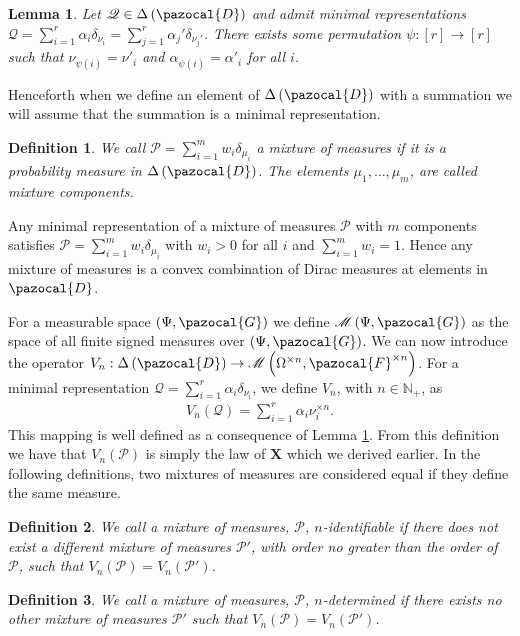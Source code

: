 \documentclass[aos,preprint]{imsart}
\def\nn{\mathbb{N}}
\def\sF{\pazocal{F}}
\def\sG{\pazocal{G}}
\def\sM{\pazocal{M}}
\def\sD{\pazocal{D}}
\def\sP{\mathscr{P}}
\def\sM{\mathscr{M}}
\def\sQ{\mathscr{Q}}
\def\bX{\mathbf{X}}
\def\dd{\Delta\left( \sD \right)}
\theoremstyle{plain}
\newtheorem{lem}{Lemma}[section]
\theoremstyle{defintion}
\newtheorem{defin}{Definition}[section]
\begin{document}
	\begin{lem} \label{lem:represent}
		Let $\sQ\in \dd$ and admit minimal representations $\sQ = \sum_{i=1}^r  \alpha_i \delta_{\nu_i}= \sum_{j=1}^r \alpha_j'\delta_{\nu_j'}$. There exists some permutation $\psi:\left[ r \right] \to \left[ r \right]$ such that $\nu_{\psi\left( i \right)} = \nu'_i$ and $\alpha_{\psi\left( i \right)} = \alpha'_i$ for all $i$.
	\end{lem}
	Henceforth when we define an element of $\dd$ with a summation we will assume that the summation is a minimal representation.
	\begin{defin} \label{def:mixmeasure}
		We call $\sP =\sum_{i=1}^m w_i \delta_{\mu_i}$ a {\em mixture of measures} if it is a probability measure in $\dd$. The elements $\mu_1,\ldots,\mu_m$, are called {\em mixture components}.
	\end{defin}

	Any minimal representation of a mixture of measures $\sP$ with $m$ components satisfies $\sP=\sum_{i=1}^m w_i \delta_{\mu_i}$ with $w_i>0$ for all $i$ and $\sum_{i=1}^m w_i = 1$. Hence any mixture of measures is a convex combination of Dirac measures at elements in $\sD$.

	
	For a measurable space $\left(\Psi, \sG \right)$ we define $\sM \left(\Psi, \sG \right)$ as the space of all finite signed measures over $\left(\Psi, \sG \right)$. We can now introduce the operator $V_n:\dd\to \sM\left( \Omega^{\times n}, \sF^{\times n} \right)$. For a minimal representation $\sQ =\sum_{i=1}^r  \alpha_i\delta_{\nu_i}$, we define $V_n$, with $n \in \nn_+$, as 
	\begin{eqnarray*}
		V_n(\sQ) =\sum_{i=1}^r  \alpha_i\nu_i^{\times n}.
	\end{eqnarray*}
	This mapping is well defined as a consequence of Lemma \ref{lem:represent}.
	From this definition we have that $V_n\left( \sP \right)$ is simply the law of $\bX$ which we derived earlier. In the following definitions, two mixtures of measures are considered equal if they define the same measure.

	\begin{defin}\label{def:ident}
		We call a mixture of measures, $\sP$, \emph{$n$-identifiable} if there does not exist a different mixture of measures $\sP'$, with order no greater than the order of $\sP$, such that $V_n\left( \sP \right) = V_n\left( \sP' \right)$.
	\end{defin}
	\begin{defin}\label{def:det}
		We call a mixture of measures, $\sP$, \emph{$n$-determined} if there exists no other mixture of measures $\sP'$ such that $V_n\left( \sP \right) = V_n\left( \sP' \right)$. 
	\end{defin}
\end{document}
